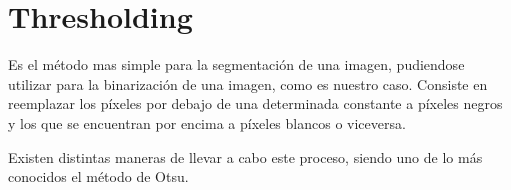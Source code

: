 \section{Thresholding}

Es el método mas simple para la segmentación de una imagen, pudiendose utilizar para la binarización de una imagen, como es nuestro caso. Consiste en reemplazar los píxeles por debajo de una determinada constante a píxeles negros y los que se encuentran por encima a píxeles blancos o viceversa.

Existen distintas maneras de llevar a cabo este proceso, siendo uno de lo más conocidos el método de Otsu.\cite{otsu}